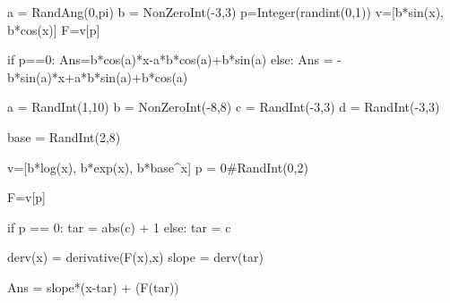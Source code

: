 



\begin{sagesilent}
a = RandAng(0,pi)
b = NonZeroInt(-3,3)
p=Integer(randint(0,1))
v=[b*sin(x), b*cos(x)]
F=v[p]

if p==0:
    Ans=b*cos(a)*x-a*b*cos(a)+b*sin(a)
else:
    Ans = -b*sin(a)*x+a*b*sin(a)+b*cos(a)
\end{sagesilent}


\begin{sagesilent}
a = RandInt(1,10)
b = NonZeroInt(-8,8)
c = RandInt(-3,3)
d = RandInt(-3,3)

base = RandInt(2,8)

v=[b*log(x), b*exp(x), b*base^x]
p = 0#RandInt(0,2)

F=v[p]

if p == 0:
    tar = abs(c) + 1
else:
    tar = c

derv(x) = derivative(F(x),x)
slope = derv(tar)

Ans = slope*(x-tar) + (F(tar))



\end{sagesilent}

